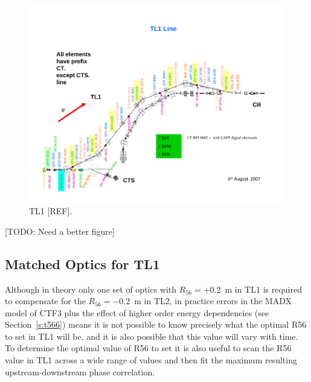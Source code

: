 \begin{landscape}
	\begin{figure}
  		\centering
  		\includegraphics[height=\textwidth]{Figures/propagation/TL1}
  		\caption{TL1 [REF].}
  		\label{f:tl1Layout}
	\end{figure}
\end{landscape}
[TODO: Need a better figure]

\subsection{Matched Optics for TL1}
\label{ss:tl1Optics}

Although in theory only one set of optics with \(R_{56} = +0.2\)~m in TL1 is required to compensate for the \(R_{56} = -0.2\)~m in TL2, in practice errors in the MADX model of CTF3 plus the effect of higher order energy dependencies (see Section~\ref{s:t566}) means it is not possible to know precisely what the optimal R56 to set in TL1 will be, and it is also possible that this value will vary with time. To determine the optimal value of R56 to set it is also useful to scan the R56 value in TL1 across a wide range of values and then fit the maximum resulting upstream-downstream phase correlation.

